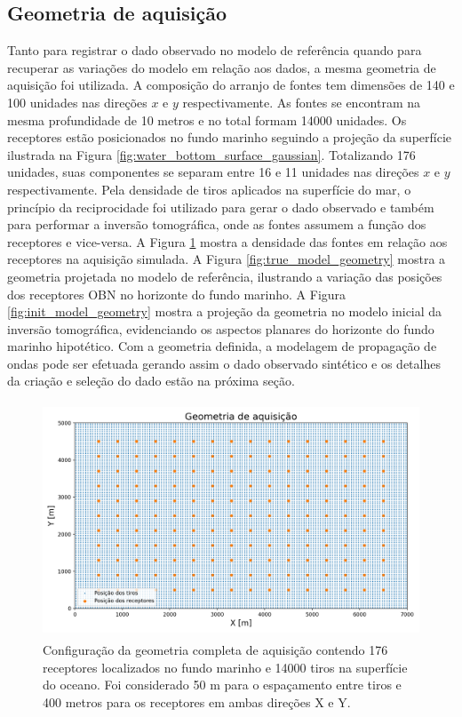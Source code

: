 \subsection*{Geometria de aquisição}

Tanto para registrar o dado observado no modelo de referência quando para recuperar as variações do modelo em relação aos dados, a mesma geometria de aquisição foi utilizada. A composição do arranjo de fontes tem dimensões de 140 e 100 unidades nas direções $x$ e $y$ respectivamente. As fontes se encontram na mesma profundidade de 10 metros e no total formam 14000 unidades. Os receptores estão posicionados no fundo marinho seguindo a projeção da superfície ilustrada na Figura \ref{fig:water_bottom_surface_gaussian}. Totalizando 176 unidades, suas componentes se separam entre 16 e 11 unidades nas direções $x$ e $y$ respectivamente. Pela densidade de tiros aplicados na superfície do mar, o princípio da reciprocidade foi utilizado para gerar o dado observado e também para performar a inversão tomográfica, onde as fontes assumem a função dos receptores e vice-versa. A Figura \ref{fig:complete_geometry} mostra a densidade das fontes em relação aos receptores na aquisição simulada. A Figura \ref{fig:true_model_geometry} mostra a geometria projetada no modelo de referência, ilustrando a variação das posições dos receptores OBN no horizonte do fundo marinho. A Figura \ref{fig:init_model_geometry} mostra a projeção da geometria no modelo inicial da inversão tomográfica, evidenciando os aspectos planares do horizonte do fundo marinho hipotético. Com a geometria definida, a modelagem de propagação de ondas pode ser efetuada gerando assim o dado observado sintético e os detalhes da criação e seleção do dado estão na próxima seção. 
\begin{figure}[H]
	\centering
	\includegraphics[width=12cm,height=7cm]{Imgs/Metodologia/complete_geometry.png}
	\caption{Configuração da geometria completa de aquisição contendo 176 receptores localizados no fundo marinho e 14000 tiros na superfície do oceano. Foi considerado 50 m para o espaçamento entre tiros e 400 metros para os receptores em ambas direções X e Y.}
	\label{fig:complete_geometry}	
\end{figure}
